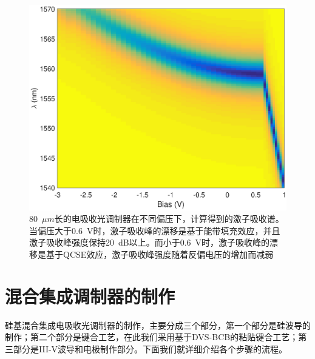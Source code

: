 \begin{figure}[htb]
	\centering
	\includegraphics[width=14cm]{./Pictures/chapt4_bandfilling_sim.eps}
	\caption{80~$\mu m$长的电吸收光调制器在不同偏压下，计算得到的激子吸收谱。当偏压大于0.6~V时，激子吸收峰的漂移是基于能带填充效应，并且激子吸收峰强度保持20~dB以上。而小于0.6~V时，激子吸收峰的漂移是基于QCSE效应，激子吸收峰强度随着反偏电压的增加而减弱}
	\label{chapt4_bandfilling_sim}
\end{figure}

\section{混合集成调制器的制作}
硅基混合集成电吸收光调制器的制作，主要分成三个部分，第一个部分是硅波导的制作；第二个部分是键合工艺，在此我们采用基于DVS-BCB的粘贴键合工艺；第三部分是III-V波导和电极制作部分。下面我们就详细介绍各个步骤的流程。
